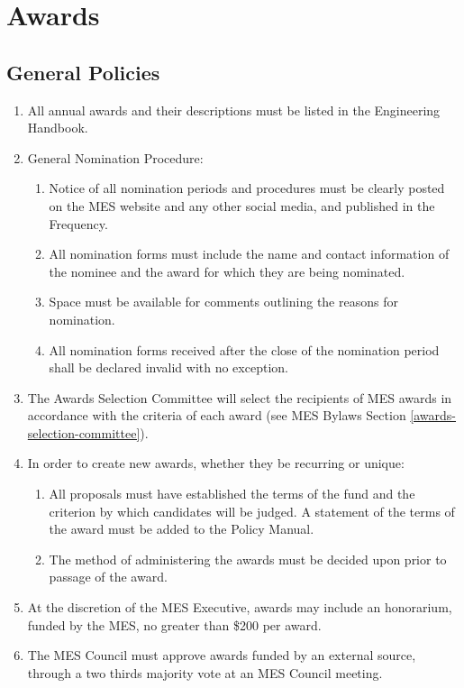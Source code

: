 \section{Awards}
\label{awards}

\subsection{General Policies}
\label{general-policies}
\begin{enumerate}
 \item
  All annual awards and their descriptions must be listed in the Engineering Handbook.
 \item
  General Nomination Procedure:

  \begin{enumerate}
   \item
    Notice of all nomination periods and procedures must be clearly posted on the MES website and any other social media, and published in the Frequency.
   \item
    All nomination forms must include the name and contact information of the nominee and the award for which they are being nominated.
   \item
    Space must be available for comments outlining the reasons for nomination.
   \item
    All nomination forms received after the close of the nomination period shall be declared invalid with no exception.
  \end{enumerate}
 \item
  The Awards Selection Committee will select the recipients of MES awards in accordance with the criteria of each award (see MES Bylaws Section \ref{awards-selection-committee}).
 \item
  In order to create new awards, whether they be recurring or unique:

  \begin{enumerate}
   \item
    All proposals must have established the terms of the fund and the criterion by which candidates will be judged. A statement of the terms of the award must be added to the Policy Manual. %
   \item
    The method of administering the awards must be decided upon prior to passage of the award.
  \end{enumerate}
 \item
  At the discretion of the MES Executive, awards may include an honorarium, funded by the MES, no greater than \$200 per award.
 \item
  The MES Council must approve awards funded by an external source, through a two thirds majority vote at an MES Council meeting.
\end{enumerate}

